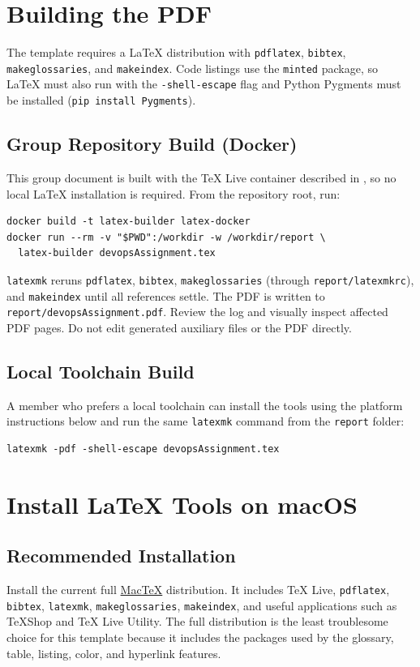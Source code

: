 \section{Building the PDF}
The template requires a LaTeX distribution with \texttt{pdflatex},
\texttt{bibtex}, \texttt{makeglossaries}, and \texttt{makeindex}.
Code listings use the \texttt{minted} package, so LaTeX must also run with the
\texttt{-shell-escape} flag and Python Pygments must be installed
(\texttt{pip install Pygments}).
\subsection{Group Repository Build (Docker)}
This group document is built with the TeX Live container described in
, so no local LaTeX installation is required. From the
repository root, run:
\begin{verbatim}
docker build -t latex-builder latex-docker
docker run --rm -v "$PWD":/workdir -w /workdir/report \
  latex-builder devopsAssignment.tex
\end{verbatim}
\texttt{latexmk} reruns \texttt{pdflatex}, \texttt{bibtex},
\texttt{makeglossaries} (through \texttt{report/latexmkrc}), and
\texttt{makeindex} until all references settle. The PDF is written to
\texttt{report/devopsAssignment.pdf}. Review the log and visually inspect
affected PDF pages. Do not edit generated auxiliary files or the PDF directly.

\subsection{Local Toolchain Build}
A member who prefers a local toolchain can install the tools using the
platform instructions below and run the same \texttt{latexmk} command from the
\texttt{report} folder:
\begin{verbatim}
latexmk -pdf -shell-escape devopsAssignment.tex
\end{verbatim}

\section{Install LaTeX Tools on macOS}
\subsection{Recommended Installation}
Install the current full \href{https://www.tug.org/mactex/}{MacTeX}
distribution. It includes TeX Live, \texttt{pdflatex}, \texttt{bibtex},
\texttt{latexmk}, \texttt{makeglossaries}, \texttt{makeindex}, and useful
applications such as TeXShop and TeX Live Utility. The full distribution is the
least troublesome choice for this template because it includes the packages
used by the glossary, table, listing, color, and hyperlink features.

